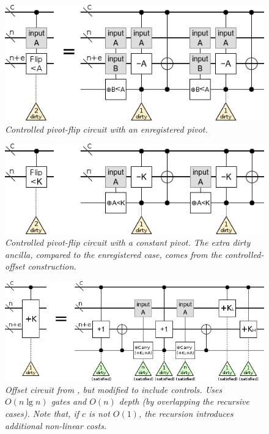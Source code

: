 \documentclass[twocolumn]{article}
\begin{document}
\begin{figure}
  \centering
  \includegraphics[width=\linewidth]{assets/controlled-pivot-flip.png}
  \caption{\em
    Controlled pivot-flip circuit with an enregistered pivot.
  }
  \label{fig:controlled-pivot-flip}
\end{figure}

\begin{figure}
  \centering
  \includegraphics[width=\linewidth]{assets/controlled-const-pivot-flip.png}
  \caption{\em
    Controlled pivot-flip circuit with a constant pivot.
    The extra dirty ancilla, compared to the enregistered case, comes from the controlled-offset construction.
  }
  \label{fig:controlled-pivot-flip}
\end{figure}

\begin{figure}
  \centering
  \includegraphics[width=\linewidth]{assets/controlled-offset.png}
  \caption{\em
      Offset circuit from \cite{haner2016}, but modified to include controls.
      Uses $O(n \lg n)$ gates and $O(n)$ depth (by overlapping the recursive cases).
      Note that, if $c$ is not $O(1)$, the recursion introduces additional non-linear costs.
  }
  \label{fig:controlled-offset}
\end{figure}
\end{document}
